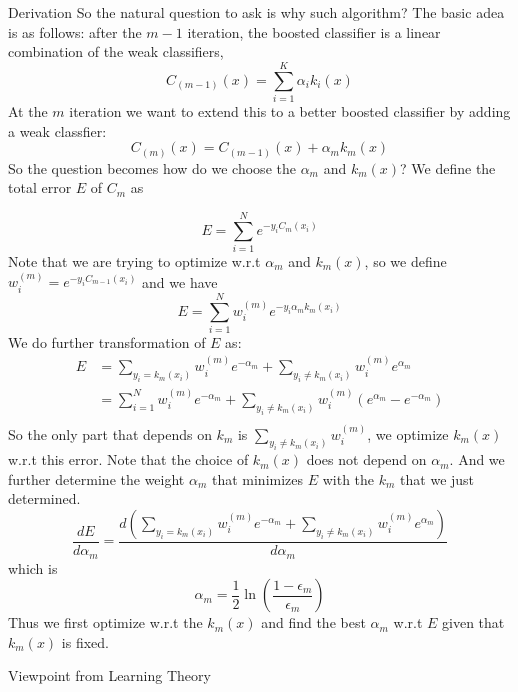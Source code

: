 \documentclass{beamer}
\begin{document}
\begin{frame}[allowframebreaks]{Derivation}
So the natural question to ask is why such algorithm? The basic adea is as follows: after the $m-1$ iteration, the boosted classifier is a linear combination of the weak classifiers,
$$C_{(m-1)}(x) = \sum_{i=1}^K \alpha_i k_i(x)$$
At the $m$ iteration we want to extend this to a better boosted classifier by adding a weak classfier:
$$C_{(m)}(x) = C_{(m-1)}(x) + \alpha_m k_m(x)$$
So the question becomes how do we choose the $\alpha_m$ and $k_m(x)$?
We define the total error $E$ of $C_m$ as 

$$E  = \sum_{i=1}^N e^{-y_i C_m(x_i)} $$
Note that we are trying to optimize w.r.t $\alpha_m$ and $k_m(x)$, so we define $w_i^(m) = e^{-y_i C_{m-1}(x_i)}$ and we have 
$$E = \sum_{i=1}^N w_i^{(m)} e^{-y_i \alpha_m k_m(x_i)}$$
We do further transformation of $E$ as:
\begin{align*}
E & = \sum_{y_i = k_m(x_i) } w_i^{(m)} e^{-\alpha_m} + \sum_{y_i \neq k_m(x_i) } w_i^{(m)}e^{\alpha_m} \\
& = \sum_{i=1}^N w_i^{(m)}e^{-\alpha_m} + \sum_{y_i \neq k_m(x_i)}  w_i^{(m)} (e^{\alpha_m} - e^{-\alpha_m}) \\
\end{align*}
So the only part that depends on $k_m$ is $\sum_{y_i \neq k_m(x_i)}  w_i^{(m)}$, we optimize $k_m(x)$ w.r.t this error.
Note that the choice of $k_m(x)$ does not depend on $\alpha_m$. And we further determine the weight $\alpha_m$ that minimizes $E$ with the $k_m$ that we just determined. 
$$\frac{d E}{d \alpha_m} = \frac{d(\sum_{y_i = k_m(x_i) } w_i^{(m)} e^{-\alpha_m} + \sum_{y_i \neq k_m(x_i) } w_i^{(m)}e^{\alpha_m})}{d \alpha_m}$$
which is 
$$\alpha_m = \frac{1}{2} \ln(\frac{1 - \epsilon_m}{\epsilon_m})$$
Thus we first optimize w.r.t the $k_m(x)$ and find the best $\alpha_m$ w.r.t $E$ given that $k_m(x)$ is fixed.
\end{frame}

\begin{frame}[allowframebreaks]{Viewpoint from Learning Theory}


\end{frame}
\end{document}
